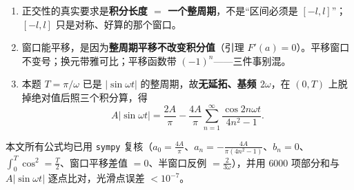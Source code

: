 \documentclass[11pt]{ctexart}
\begin{document}



\begin{enumerate}[label=(\arabic*)]
\item 正交性的真实要求是\textbf{积分长度 $=$ 一个整周期}，不是“区间必须是 $[-l,l]$”；$[-l,l]$ 只是对称、好算的那个窗口。
\item 窗口能平移，是因为\textbf{整周期平移不改变积分值}（引理 $F'(a)=0$）。平移窗口不变号；换元带雅可比；平移函数带 $(-1)^n$——三件事别混。
\item 本题 $T=\pi/\omega$ 已是 $|\sin\omega t|$ 的整周期，故\textbf{无延拓、基频 $2\omega$}，在 $(0,T)$ 上脱掉绝对值后照三个积分算，得
\[
A|\sin\omega t|=\frac{2A}{\pi}-\frac{4A}{\pi}\sum_{n=1}^{\infty}\frac{\cos 2n\omega t}{4n^2-1}.
\]
\end{enumerate}

\flowerrule

{\small\color{inkgray}本文所有公式均已用 \texttt{sympy} 复核（$a_0=\frac{4A}{\pi}$、$a_n=-\frac{4A}{\pi(4n^2-1)}$、$b_n=0$、$\int_0^T\cos^2=\frac T2$、窗口平移差值 $=0$、半窗口反例 $=\frac{2}{3\omega}$），并用 $6000$ 项部分和与 $A|\sin\omega t|$ 逐点比对，光滑点误差 $<10^{-7}$。}
\end{document}
